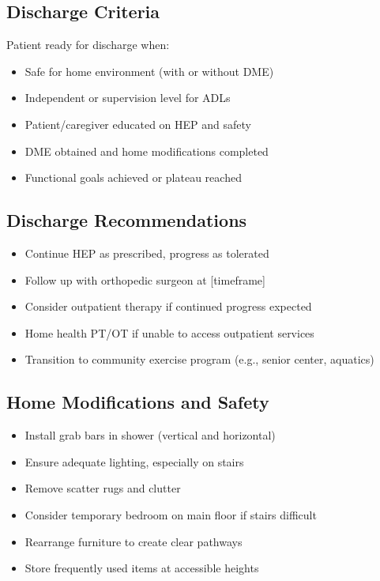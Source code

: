 \documentclass[11pt,letterpaper]{article}
\begin{document}
\subsection*{Discharge Criteria}

Patient ready for discharge when:
\begin{itemize}[leftmargin=*]
    \item Safe for home environment (with or without DME)
    \item Independent or supervision level for ADLs
    \item Patient/caregiver educated on HEP and safety
    \item DME obtained and home modifications completed
    \item Functional goals achieved or plateau reached
\end{itemize}

\subsection*{Discharge Recommendations}

\begin{itemize}[leftmargin=*]
    \item Continue HEP as prescribed, progress as tolerated
    \item Follow up with orthopedic surgeon at [timeframe]
    \item Consider outpatient therapy if continued progress expected
    \item Home health PT/OT if unable to access outpatient services
    \item Transition to community exercise program (e.g., senior center, aquatics)
\end{itemize}

\subsection*{Home Modifications and Safety}

\begin{itemize}[leftmargin=*]
    \item Install grab bars in shower (vertical and horizontal)
    \item Ensure adequate lighting, especially on stairs
    \item Remove scatter rugs and clutter
    \item Consider temporary bedroom on main floor if stairs difficult
    \item Rearrange furniture to create clear pathways
    \item Store frequently used items at accessible heights
\end{itemize}
\end{document}
